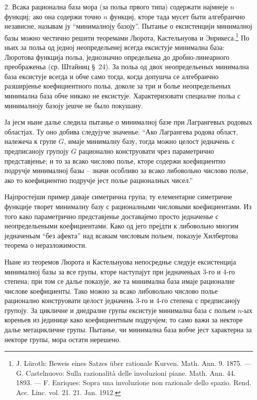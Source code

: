 \documentclass[11pt]{article}
\begin{document}
2. Всака рационална база мора (за польа првого типа) содержати најмнеје $n$ функциј; ако она содержи точно $n$ функциј, кторе тада мусет быти алгебраично независне, называм ју ``минималноју базоју''. Пытанье о ексистенцији минималној базы можно честично решити теоремами Люрота, Кастельнуова и Энрикеса.\footnote{J. Lüroth: Beweis eines Satzes über rationale Kurven. Math. Ann. 9. 1875. --- G. Castelnuovo: Sulla razionalità delle involuzioni piane. Math. Ann. 44. 1893. --- F. Enriques: Sopra una involuzione non razionale dello spazio. Rend. Acc. Linc. vol. 21. 21. Jan. 1912.} По ньих за польа од једној неопредельенеј всегда ексистује минимална база: Люротова функција польа, једнозначно определьена до дробно-линеарного преображеньа (ср. Штайниц \S\ 24). За польа од двох неопредельеных минимална база ексистује всегда и обче само тогда, когда допушча се алгебраично разширјенье коефициентного польа, доколе за три и болье неопредельеных минимална база обче никако не ексистује. Характеризовати специалне польа с минималноју базоју јешче не было покушану.

Ја јесм ныне далье следила пытанье о минималној базе при Лагрангевых родовых областјах. Ту оно добива следујуче значенье: ``Ако Лагрангева родова област, належеча к групе $G$, имаје минималну базу, тогда можно целост једначень с предписаноју групоју $G$ рационално конструовати чрез параметрично представјенье; и то за всако числово полье, кторе содержи коефициентно подручје минималној базы -- значи особливо за всако либовольно числово полье, ако то коефициентно подручје јест полье рационалных чисел.''

Најпростејши пример даваје симетрична група; ту елементарне симетричне функције творет минималну базу с рационалными числовыми коефициентами. Из того како параметрично представјенье доставајемо просто једначенье с неопредельеными коефициентами. Како од јего прејдти к либовольно многим једначеньам ``без афекта'' над всакым числовым польем, показује Хилбертова теорема о неразложимости.

Ныне из теоремов Люрота и Кастельнуова непосреднье следује ексистенција минималној базы за все групы, кторе наступајут при једначеньах 3-го и 4-го степена; при том се далье показује, же та минимална база имаје рационалне числове коефициенты. Тако можно за всако либовольно числово полье рационално конструовати целост једначень 3-го и 4-го степена с предписаноју групоју. За цикличне и диедралне групы ексистује минимална база с польем $n$-ых кореньев из јединице како коефициентным подручјем; то само важи за некторе далье метацикличне групы. Пытанье, чи минимална база вобче јест характерна за некторе групы, мора остати нерешено.
\end{document}
